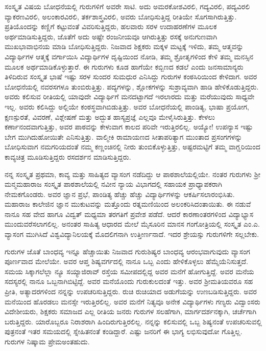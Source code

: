 {ಸಂಸ್ಕೃತ ವಿಷಯ ಬೋಧನೆಯಲ್ಲಿ ಗುರುಗಳಿಗೆ ಅವರೇ ಸಾಟಿ. ಅದು ಅಮರಕೋಶ\-ವಿರಲಿ, ಗದ್ಯವಿರಲಿ, ಪದ್ಯವಿರಲಿ ವ್ಯಾಕರಣವಿರಲಿ, ಅಲಂಕಾರವಿರಲಿ, ತರ್ಕಶಾಸ್ತ್ರ\-ವಿರಲಿ, ಅವರು ಬೋಧಿಸುತ್ತಿದ್ದ ರೀತಿಯೇ ಸೊಗಸಾಗಿರುತ್ತಿತ್ತು. ಪ್ರತಿಯೊಂದನ್ನು ಕಣ್ಣಿಗೆ ಕಟ್ಟುವಂತೆ ವಿವರಿಸುತ್ತಿದ್ದರು, ಹಲವಾರು ಸರಳ ಉದಾಹರಣೆಗಳ ಮೂಲಕ ಅರ್ಥಮಾಡಿ\-ಸುತ್ತಿದ್ದರು, ಜೊತೆಗೆ ಅದು ಅಷ್ಟೇ ರಂಜನೀಯವೂ ಆಗಿರುತ್ತಿತ್ತು ರಸಕ್ಕೆ ಅನುಗುಣವಾಗಿ ಮುಖಭಾವಾಭಿನಯ ಮಾಡಿ ಬೋಧಿಸುತ್ತಿದ್ದರು. ನಿಜವಾದ ಶಿಕ್ಷಕರು ಮಕ್ಕಳ ಮಟ್ಟಕ್ಕೆ ಇಳಿದು, ತಮ್ಮ ಆತ್ಮವನ್ನು ವಿದ್ಯಾರ್ಥಿಗಳ ಆತ್ಮಕ್ಕೆ ವರ್ಗಾಯಿಸಿ ವಿದ್ಯಾರ್ಥಿಗಳ ದೃಷ್ಟಿಯಿಂದ ನೋಡಿ, ತಮ್ಮ ಶ್ರೋತೃಗಳಿಂದ ಕೇಳಿ ತಮ್ಮ ಮನಸ್ಸಿನ ಮೂಲಕ ಅರ್ಥಮಾಡಿಕೊಳ್ಳುತ್ತಾರೆ. ಈ ಗುರುಗಳು ಕೂಡ ಹಾಗೆಯೇ ಕಬ್ಬಿಣದ ಕಡಲೆ ಎಂದು ಜನಸಾಮಾನ್ಯರು ತಿಳಿದಿರುವ ಸಂಸ್ಕೃತ ಭಾಷೆ ಇಷ್ಟು ಸರಳ ಸುಂದರ ಸುಮಧುರ ಎನಿಸಿದ್ದು ಗುರುಗಳ ಕಂಠಸಿರಿಯಿಂದ ಕೇಳಿದಾಗ. ಅವರ ಬೋಧನೆಯಲ್ಲಿ ನವರಸಗಳೂ ತುಂಬಿರುತ್ತಿತ್ತು. ಪದ್ಯಗಳನ್ನು, ಶ್ಲೋಕಗಳನ್ನು ಸುಶ್ರಾವ್ಯವಾಗಿ ಹಾಡಿ ಹೇಳಿಕೊಡುತ್ತಿದ್ದರು. ಅವರು ಕಲಿಸುವ ರೀತಿಯಲ್ಲಿ ಯಾವುದೇ ವಿದ್ಯಾರ್ಥಿಗೆ ಮನದಟ್ಟಾಗದೆ ಇರಲಾರದು ಮತ್ತು ಮರೆಯುವುದು ಸಾಧ್ಯವೇ ಇಲ್ಲ. ಅವರು ಕಲಿಸಿದ್ದು ಅಲ್ಲಿಯೇ ಕಂಠಸ್ಥವಾಗಿಬಿಡುತ್ತಿತ್ತು. ಅವರ ಬೋಧನೆಯಲ್ಲಿ ಪಾಂಡಿತ್ಯ, ಭಾಷಾ ಪ್ರಯೋಗ, ಕ್ಷಣಸ್ಪುರತೆ, ವಿವರಣೆ, ವಿಶ್ಲೇಷಣೆ ಮತ್ತು ಅದ್ಭುತ ಹಾಸ್ಯಪ್ರಜ್ಞೆ ಎಲ್ಲವೂ ಮೇಳೈಸಿರುತ್ತಿತ್ತು. ಕೇಳಲು ಕರ್ಣಾನಂದವಾಗುತ್ತಿತ್ತು, ಅವರ ಪಾಠವನ್ನು ಕೇಳುವಾಗ ಕಾಲದ ಪರಿವೇ ಇರುತ್ತಿರಲಿಲ್ಲ. ಅಯ್ಯೋ! ಉಪನ್ಯಾಸ ಇಷ್ಟು ಬೇಗ ಮುಗಿದುಹೋಯಿತೇ ಎನಿಸುತ್ತಿತ್ತು. ವಾಲ್ಮೀಕಿ ರಾಮಾಯಣದ ಸೀತಾಪರಿತ್ಯಾಗ ಮುಂತಾದ ಪ್ರಸಂಗಗಳನ್ನು ಬೋಧಿಸುವಾಗ ನಮಗರಿಯದಂತೆ ನಮ್ಮ ಕಣ್ಣಂಚಿನಲ್ಲಿ ನೀರು ತುಂಬಿಕೊಳ್ಳುತ್ತಿತ್ತು, ಅಷ್ಟರಮಟ್ಟಿಗೆ ತಮ್ಮ ವಾಗ್ಝರಿಯಿಂದ ಕಾವ್ಯಚಿತ್ರ ಮೂಡಿಸುತ್ತಿದ್ದರು ರಸದರ್ಶನ ಮಾಡಿಸುತ್ತಿದ್ದರು.

ನನ್ನ ಸಂಸ್ಕೃತ ಪ್ರಥಮಾ, ಕಾವ್ಯ ಮತ್ತು ಸಾಹಿತ್ಯದ ವ್ಯಾಸಂಗ ನಡೆದಿದ್ದು ಆ ಪಾಠಶಾಲೆಯಲ್ಲಿಯೇ. ನಂತರ ಗುರುಗಳು ಶ್ರೀ ಮನ್ಮಮಹಾರಾಜ ಸಂಸ್ಕೃತ ಪಾಠಶಾಲೆಯಲ್ಲಿ ನವೀನ ನ್ಯಾಯ ವಿಭಾಗದಲ್ಲಿ ಸಹಾಯಕ ಪ್ರಾಧ್ಯಾಪಕರಾಗಿ ನೇಮಕಗೊಂಡರು. ಅವರ ಜ್ಞಾನ ಪ್ರಭೆ, ಪಾಂಡಿತ್ಯ ಹೆಚ್ಚು ಹೆಚ್ಚು ವಿದ್ಯಾರ್ಥಿಗಳನ್ನು ಆಕರ್ಷಿಸಲಾರಂಭಿಸಿತು. ಮಹಾರಾಜ ಕಾಲೇಜಿನ ಜ್ಞಾನ ಮುಕುಟವನ್ನು ಮತ್ತೊಂದು ರತ್ನಮಣಿಯಿಂದ ಅಲಂಕರಿಸಿದಂತಾಯಿತು. ಈ ನಡುವೆ ನಾನೂ ಸಹ ವೇದ ಹಾಗೂ ವಿದ್ವತ್ ಮಧ್ಯಮಾ ತರಗತಿಗೆ ಪ್ರವೇಶ ಪಡೆದೆ. ಆದರೆ ಕಾರಣಾಂತರಗಳಿಂದ ವಿದ್ಯಾಭ್ಯಾಸ ಮುಂದುವರೆಸಲಾಗಲಿಲ್ಲ. ಅನಂತರ ಸಾಹಿತ್ಯ ಆಧಾರದ ಮೇಲೆ ಮೈಸೂರಿನ ಮಾನಸ ಗಂಗೋತ್ರಿಯಲ್ಲಿ ಸಂಸ್ಕೃತ ಎಂ.ಎ. ವ್ಯಾಸಂಗ ಮುಗಿಸಿದೆ ವಿಶ್ವವಿದ್ಯಾನಿಲಯಕ್ಕೆ ಮೊದಲಿಗನಾಗಿ ಉತ್ತೀರ್ಣನಾದೆ. ಇದರ ಶ್ರೇಯಸ್ಸು ಗುರುಗಳಿಗೇ ಸಲ್ಲಬೇಕು.

ಗುರುಗಳ ಜೊತೆ ಬಾಂಧವ್ಯ ಇನ್ನೂ ಹೆಚ್ಚಾಯಿತು ನಿಜವಾದ ಗುರು\enginline{-}ಶಿಷ್ಯರ ಬಾಂಧವ್ಯ ಆರಂಭವಾಗುವುದು ವ್ಯಾಸಂಗ ಪೂರ್ಣವಾದ ಮೇಲೆಯೇ. ಅವರ ಆಪ್ತ ಶಿಷ್ಯವರ್ಗದಲ್ಲಿ ನಾನೂ ಒಬ್ಬ ಎಂದು ಹೇಳಿಕೊಳ್ಳಲು ಹೆಮ್ಮೆಯೆನಿಸುತ್ತದೆ. ಸಮಯ ಸಿಕ್ಕಾಗಲೆಲ್ಲಾ ನ್ಯೂ ಸಯ್ಯಾಜಿರಾವ್ ರಸ್ತೆಯ ಸಮೀಪದಲ್ಲಿದ್ದ ಅವರ ಮನೆಗೆ ಹೋಗುತ್ತಿದ್ದೆ. ಅವರ ಮನೆಯ ಸದಸ್ಯರಲ್ಲಿ ನಾನೂ ಒಬ್ಬನಾಗಿಬಿಟ್ಟಿದ್ದೆ. ಅವರ ಮನೆಯೊಂದು ಗುರುಕುಲದಂತೆ ಇತ್ತು. ಅವರ ಶ್ರೀಮತಿಯವರೂ ಸಹ ಪ್ರೀತಿ, ಅತ್ಯಾದರಗಳಿಂದ ನನ್ನನ್ನು ಉಪಚರಿಸುತ್ತಿದ್ದರು. ರುಚಿ ರುಚಿಯಾದ ಅಡುಗೆಯನ್ನು ಉಣಬಡಿಸುತ್ತಿದ್ದರು. ಅವರ ಮನೆಯಿಂದ ಹೊರಡಲು ಮನಸ್ಸೇ ಇರುತ್ತಿರಲಿಲ್ಲ. ಅವರ ಮನೆಗೆ ನಿತ್ಯವೂ ಅನೇಕ ವಿದ್ಯಾರ್ಥಿಗಳು ಗಣ್ಯರು ವಿದ್ವಾಂಸರು ವಿದೇಶೀಯರು, ಶಿಕ್ಷಕರು ಸಮಾಜದ ಎಲ್ಲ ರೀತಿಯ ಜನರು ಗುರುಗಳ ಸಲಹೆಗಾಗಿ, ಮಾರ್ಗದರ್ಶನಕ್ಕಾಗಿ, ಚರ್ಚೆಗಾಗಿ ಬರುತ್ತಿದ್ದರು. ಯಾರೊಬ್ಬರೂ ನಿರಾಶರಾಗಿ ಹಿಂದಿರುಗುತ್ತಿರಲಿಲ್ಲ. ನನ್ನನ್ನು ಕಲಿಸುವಲ್ಲಿ ಒಬ್ಬ ಶಿಷ್ಯನಂತೆ ಉಪಚರಿಸುವಲ್ಲಿ ಪುತ್ರನಂತೆ ಇತರ ಸಮಯದಲ್ಲಿ ಸ್ನೇಹಿತನಂತೆ ಕಂಡಿದ್ದಾರೆ. ಎಷ್ಟು ಜನರಿಗೆ ಈ ಭಾಗ್ಯ ಲಭಿಸುವುದೋ ಗೊತ್ತಿಲ್ಲ. ಗುರುಗಳ ನಿಷ್ಕಾಮ ಪ್ರೇಮ\break ಅಂತಹುದು.

}
